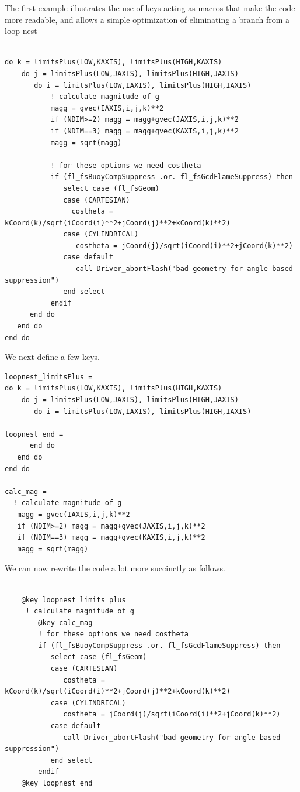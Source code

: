 \documentclass{article}
\begin{document}
The first example illustrates the use of keys acting as macros that
make the code more readable, and allows a simple optimization of
eliminating a branch from a loop nest
\begin{verbatim}

do k = limitsPlus(LOW,KAXIS), limitsPlus(HIGH,KAXIS)
    do j = limitsPlus(LOW,JAXIS), limitsPlus(HIGH,JAXIS)
       do i = limitsPlus(LOW,IAXIS), limitsPlus(HIGH,IAXIS)
           ! calculate magnitude of g
           magg = gvec(IAXIS,i,j,k)**2
           if (NDIM>=2) magg = magg+gvec(JAXIS,i,j,k)**2
           if (NDIM==3) magg = magg+gvec(KAXIS,i,j,k)**2
           magg = sqrt(magg)

           ! for these options we need costheta
           if (fl_fsBuoyCompSuppress .or. fl_fsGcdFlameSuppress) then
              select case (fl_fsGeom)
              case (CARTESIAN)
                costheta = kCoord(k)/sqrt(iCoord(i)**2+jCoord(j)**2+kCoord(k)**2)
              case (CYLINDRICAL)
                 costheta = jCoord(j)/sqrt(iCoord(i)**2+jCoord(k)**2)
              case default
                 call Driver_abortFlash("bad geometry for angle-based suppression")
              end select
           endif
      end do
   end do
end do
\end{verbatim}
We next define a few keys.

\begin{verbatim}
loopnest_limitsPlus =
do k = limitsPlus(LOW,KAXIS), limitsPlus(HIGH,KAXIS)
    do j = limitsPlus(LOW,JAXIS), limitsPlus(HIGH,JAXIS)
       do i = limitsPlus(LOW,IAXIS), limitsPlus(HIGH,IAXIS)

loopnest_end =
      end do
   end do
end do

calc_mag =
  ! calculate magnitude of g
   magg = gvec(IAXIS,i,j,k)**2
   if (NDIM>=2) magg = magg+gvec(JAXIS,i,j,k)**2
   if (NDIM==3) magg = magg+gvec(KAXIS,i,j,k)**2
   magg = sqrt(magg)

\end{verbatim}

We can now rewrite the code a lot more succinctly as follows.
\begin{verbatim}

    @key loopnest_limits_plus
     ! calculate magnitude of g
        @key calc_mag
        ! for these options we need costheta
        if (fl_fsBuoyCompSuppress .or. fl_fsGcdFlameSuppress) then
           select case (fl_fsGeom)
           case (CARTESIAN)
              costheta = kCoord(k)/sqrt(iCoord(i)**2+jCoord(j)**2+kCoord(k)**2)
           case (CYLINDRICAL)
              costheta = jCoord(j)/sqrt(iCoord(i)**2+jCoord(k)**2)
           case default
              call Driver_abortFlash("bad geometry for angle-based suppression")
           end select
        endif
    @key loopnest_end
\end{verbatim}
\end{document}
